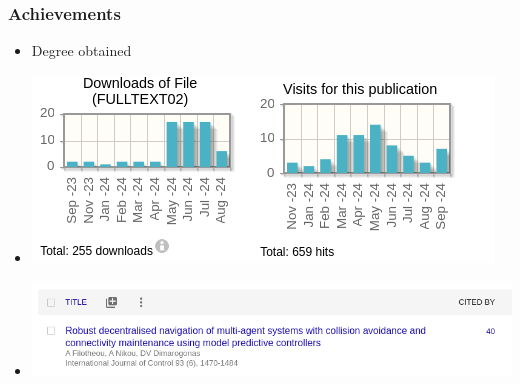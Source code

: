 \begin{frame}
  \frametitle{Achievements}

\begin{itemize}
    \item Degree obtained
    \item
      \begin{minipage}{\linewidth}
        \includegraphics[scale=0.4]{figures/03/kth_ach_1.png}
      \end{minipage}
    \item
      \begin{minipage}{\linewidth}
        \includegraphics[scale=0.3]{figures/03/kth_ach_2.png}
      \end{minipage}
\end{itemize}

\end{frame}
